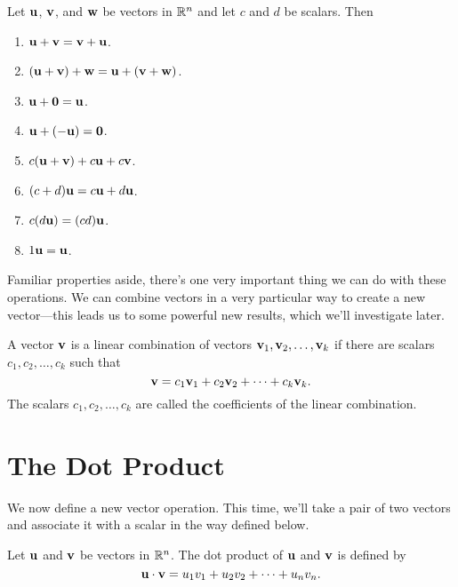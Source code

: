 \documentclass[../m073main.tex]{subfiles}
\begin{document}
\begin{theorem}
	Let $\mathbf{u}$, $\mathbf{v}$, and $\mathbf{w}$ be vectors in $\mathbb{R}^n$ and let $c$ and $d$ be scalars.
	Then
	\begin{multicols}{2}
		\begin{enumerate}[label=(\alph*)]
			\item $\mathbf{u} + \mathbf{v} = \mathbf{v} + \mathbf{u}$.
			\item $(\mathbf{u} + \mathbf{v}) + \mathbf{w} = \mathbf{u} + (\mathbf{v} + \mathbf{w})$.
			\item $\mathbf{u} + \mathbf{0} = \mathbf{u}$.
			\item $\mathbf{u} + (-\mathbf{u}) = \mathbf{0}$.
			\item $c(\mathbf{u} + \mathbf{v}) + c \mathbf{u} + c \mathbf{v}$.
			\item $(c + d) \mathbf{u} = c \mathbf{u} + d \mathbf{u}$.
			\item $c(d \mathbf{u}) = (cd) \mathbf{u}$.
			\item $1 \mathbf{u} = \mathbf{u}$.
		\end{enumerate}
	\end{multicols}
\end{theorem}

Familiar properties aside, there's one very important thing we can do with these operations.
We can combine vectors in a very particular way to create a new vector---this leads us to some powerful new results, which we'll investigate later.

\begin{definition}
	A vector $\mathbf{v}$ is a linear combination of vectors $\mathbf{v}_1, \mathbf{v}_2, \ldots, \mathbf{v}_k$ if there are scalars $c_1, c_2, \ldots, c_k$ such that
	\[ \mathbf{v} = c_1 \mathbf{v}_1 + c_2 \mathbf{v}_2 + \cdots + c_k \mathbf{v}_k. \]
	The scalars $c_1, c_2, \ldots, c_k$ are called the coefficients of the linear combination.
\end{definition}

\section{The Dot Product}
We now define a new vector operation.
This time, we'll take a pair of two vectors and associate it with a scalar in the way defined below.

\begin{definition}
	Let $\mathbf{u}$ and $\mathbf{v}$ be vectors in $\mathbb{R}^n$.
	The dot product of $\mathbf{u}$ and $\mathbf{v}$ is defined by
	\[ \mathbf{u} \cdot \mathbf{v} = u_1 v_1 + u_2 v_2 + \cdots + u_n v_n. \]
\end{definition}
\end{document}
